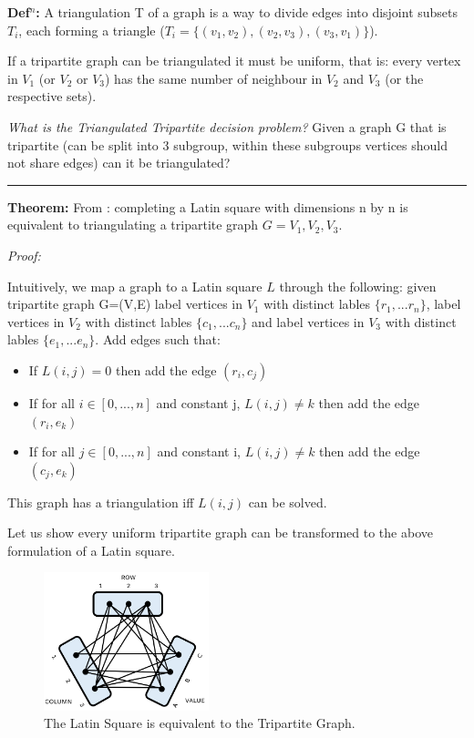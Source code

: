 \documentclass[a4paper,11pt]{report}
\newcounter{row}
\newcounter{col}
\newcounter{rowb}
\newcounter{colb}
\newcommand\setrowb[3]{
  \setcounter{colb}{1}
  \foreach \n in {#1, #2, #3} {
    \edef\x{\value{colb} - 0.5}
    \edef\y{3.5 - \value{rowb}}
    \node[anchor=center] at (\x, \y) {\n};
    \stepcounter{colb}
  }
  \stepcounter{rowb}
}
\begin{document}
\textbf{Def$^n$:} A triangulation T of a graph is a way to divide edges into disjoint subsets $T_i$, each forming a triangle ($T_i=\{(v_{1}, v_{2}),(v_{2}, v_{3}),(v_{3},v_{1})\}$).

If a tripartite graph can be triangulated it must be uniform, that is: every vertex in $V_1$ (or $V_2$ or $V_3$) has the same number of neighbour in $V_2$ and $V_3$ (or the respective sets).

\textit{What is the Triangulated Tripartite decision problem?} Given a graph G that is tripartite (can be split into 3 subgroup, within these subgroups vertices should not share edges) can it be triangulated?

\noindent\rule{4cm}{0.4pt}

\textbf{Theorem:} From \cite{lsttg}: completing a Latin square with dimensions n by n is equivalent to triangulating a tripartite graph $G= V_1, V_2, V_3$.

\textit{Proof:} 

Intuitively, we map a graph to a Latin square $L$ through the following: 
given tripartite graph G=(V,E) label vertices in $V_1$ with distinct lables $\{r_1,...r_n\}$, label vertices in $V_2$ with distinct lables $\{c_1,...c_n\}$ and label vertices in $V_3$ with distinct lables $\{e_1,...e_n\}$. Add edges such that:
\begin{itemize}
\item{If $L(i,j) = 0$ then add the edge $(r_i,c_j)$ }
\item{If for all $i \in [0,...,n]$ and constant j, $L(i,j) \neq k$ then add the edge $(r_i,e_k)$}
\item{If for all $j \in [0,...,n]$ and constant i, $L(i,j) \neq k$ then add the edge $(c_j,e_k)$}
\end{itemize}
This graph has a triangulation iff $L(i,j)$ can be solved.

Let us show every uniform tripartite graph can be transformed to the above formulation of a Latin square.

\begin{figure}[h!]
\centering
{}

\includegraphics[height=40mm]{figures/ttg.png}
\caption{The Latin Square is equivalent to the Tripartite Graph.}
\end{figure}
\end{document}
